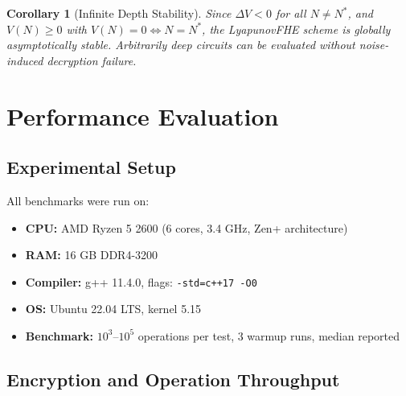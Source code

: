 \documentclass[11pt,a4paper]{article}
\newtheorem{corollary}[theorem]{Corollary}
\begin{document}
\begin{corollary}[Infinite Depth Stability]
\label{cor:infinite}
Since $\Delta V < 0$ for all $N \neq N^*$, and $V(N) \geq 0$ with $V(N)=0 \iff N=N^*$, the LyapunovFHE scheme is globally asymptotically stable. Arbitrarily deep circuits can be evaluated without noise-induced decryption failure.
\end{corollary}

\newpage

\section{Performance Evaluation}
\label{sec:performance}

\subsection{Experimental Setup}

All benchmarks were run on:
\begin{itemize}[leftmargin=*,itemsep=1pt]
    \item \textbf{CPU:} AMD Ryzen 5 2600 (6 cores, 3.4 GHz, Zen+ architecture)
    \item \textbf{RAM:} 16 GB DDR4-3200
    \item \textbf{Compiler:} g++ 11.4.0, flags: \texttt{-std=c++17 -O0}
    \item \textbf{OS:} Ubuntu 22.04 LTS, kernel 5.15
    \item \textbf{Benchmark:} $10^3$--$10^5$ operations per test, 3 warmup runs, median reported
\end{itemize}

\subsection{Encryption and Operation Throughput}
\end{document}
